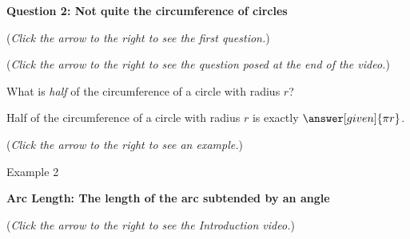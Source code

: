 \documentclass{ximera}
\begin{document}
\textbf{Question 2: Not quite the circumference of circles}
\begin{question}
\begin{flushright}
{\color{blue}(\emph{Click the arrow to the right to see the first question.})}
\end{flushright}
\begin{center}
\begin{expandable}
{\color{blue}(\emph{Click the arrow to the right to see the question
posed at the end of the video.})}
\begin{expandable}
What is \emph{half} of the circumference of a circle with radius $r$?
\begin{prompt}
Half of the circumference of a circle with radius $r$ is exactly $\answer[given]{\pi r}$.
\end{prompt}
\begin{flushright}
{\color{blue}(\emph{Click the arrow to the right to see an example.})}
\end{flushright}
\begin{expandable}
Example 2
\end{expandable}
\end{expandable}
\end{expandable}
\end{center}
\end{question}


\textbf{Arc Length: The length of the arc subtended by an angle}
\begin{explanation}
\begin{flushright}
{\color{blue}(\emph{Click the arrow to the right to see the Introduction video.})}
\end{flushright}
\begin{center}
\begin{expandable}
\end{expandable}
\end{center}
\end{explanation}
\end{document}
